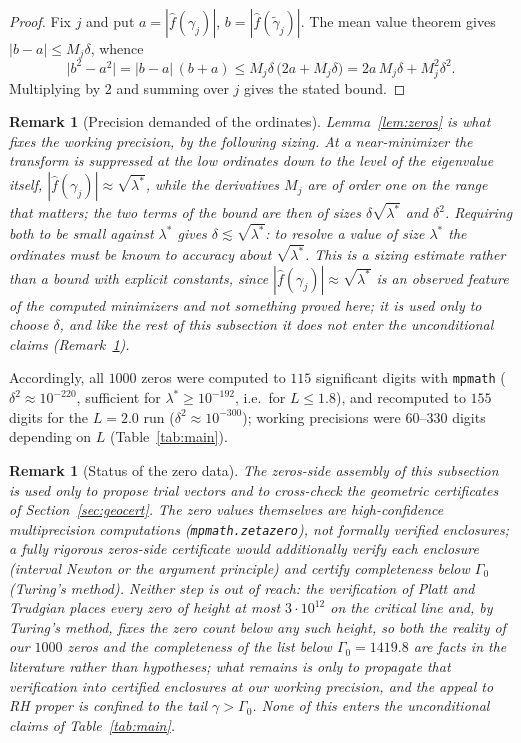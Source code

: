 ﻿\documentclass[11pt]{article}
\newtheorem{remark}[theorem]{Remark}
\newcommand{\lmin}{\lambda^{*}}
\newcommand{\fhat}{\hat f}
\begin{document}
\begin{proof}
Fix $j$ and put $a=|\fhat(\gamma_j)|$, $b=|\fhat(\tilde\gamma_j)|$.  The
mean value theorem gives $|b-a|\le M_j\delta$, whence
\[
  \bigl|b^{2}-a^{2}\bigr|=|b-a|\,(b+a)
  \le M_j\delta\,\bigl(2a+M_j\delta\bigr)
  =2a\,M_j\delta+M_j^{2}\delta^{2} .
\]
Multiplying by $2$ and summing over $j$ gives the stated bound.
\end{proof}

\begin{remark}[Precision demanded of the ordinates]\label{rem:zeroprec}
Lemma~\ref{lem:zeros} is what fixes the working precision, by the
following sizing.  At a near-minimizer the transform is suppressed at
the low ordinates down to the level of the eigenvalue itself,
$|\fhat(\gamma_j)|\approx\sqrt{\lmin}$, while the derivatives $M_j$ are
of order one on the range that matters; the two terms of the bound are
then of sizes $\delta\sqrt{\lmin}$ and $\delta^{2}$.  Requiring both to
be small against $\lmin$ gives $\delta\lesssim\sqrt{\lmin}$: to resolve
a value of size $\lmin$ the ordinates must be known to accuracy about
$\sqrt{\lmin}$.  This is a sizing estimate rather than a bound with
explicit constants, since $|\fhat(\gamma_j)|\approx\sqrt{\lmin}$ is an
observed feature of the computed minimizers and not something proved
here; it is used only to choose $\delta$, and like the rest of this
subsection it does not enter the unconditional claims
(Remark~\ref{rem:zerostatus}).
\end{remark}

Accordingly, all $1000$ zeros were computed to $115$ significant
digits with \texttt{mpmath} ($\delta^2\approx10^{-220}$, sufficient
for $\lmin\ge10^{-192}$, i.e.\ for $L\le1.8$), and recomputed to $155$
digits for the $L=2.0$ run ($\delta^{2}\approx10^{-300}$); working
precisions were $60$--$330$ digits depending on $L$
(Table~\ref{tab:main}).

\begin{remark}[Status of the zero data]\label{rem:zerostatus}
The zeros-side assembly of this subsection is used only to
\emph{propose} trial vectors and to cross-check the geometric
certificates of Section~\ref{sec:geocert}.  The zero values themselves
are high-confidence multiprecision computations
(\texttt{mpmath.zetazero}), not formally verified enclosures; a fully
rigorous zeros-side certificate would additionally verify each
enclosure (interval Newton or the argument principle) and certify
completeness below $\Gamma_0$ (Turing's method).  Neither step is out
of reach: the verification of Platt and Trudgian
\cite{PlattTrudgian2021} places every zero of height at most
$3\cdot10^{12}$ on the critical line and, by Turing's method, fixes
the zero count below any such height, so both the reality of our
$1000$ zeros and the completeness of the list below
$\Gamma_0=1419.8$ are facts in the literature rather than hypotheses;
what remains is only to propagate that verification into certified
enclosures at our working precision, and the appeal to RH proper is
confined to the tail $\gamma>\Gamma_0$.  None of this enters
the unconditional claims of Table~\ref{tab:main}.
\end{remark}
\end{document}
